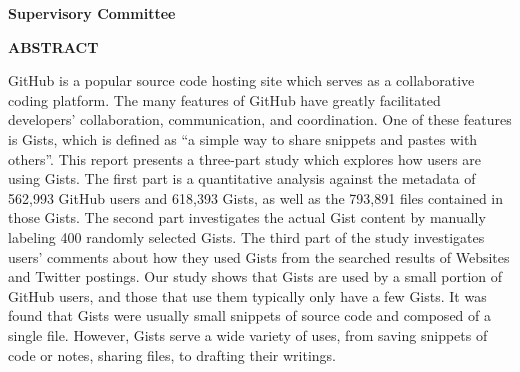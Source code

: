 \newpage
{}

\noindent \textbf{Supervisory Committee}
\tpbreak
\panel

\begin{center}
\textbf{ABSTRACT}
\end{center}

GitHub is a popular source code hosting site which serves as a collaborative coding platform. The many features of GitHub have greatly facilitated developers' collaboration, communication, and coordination. One of these features is Gists, which is defined as ``a simple way to share snippets and pastes with others''. This report presents a three-part study which explores how users are using Gists. The first part is a quantitative analysis against the metadata of 562,993 GitHub users and 618,393 Gists, as well as the 793,891 files contained in those Gists. The second part investigates the actual Gist content by manually labeling 400 randomly selected Gists. The third part of the study investigates users' comments about how they used Gists from the searched results of Websites and Twitter postings. Our study shows that Gists are used by a small portion of GitHub users, and those that use them typically only have a few Gists. It was found that Gists were usually small snippets of source code and composed of a single file. However, Gists serve a wide variety of uses, from saving snippets of code or notes, sharing files, to drafting their writings.
